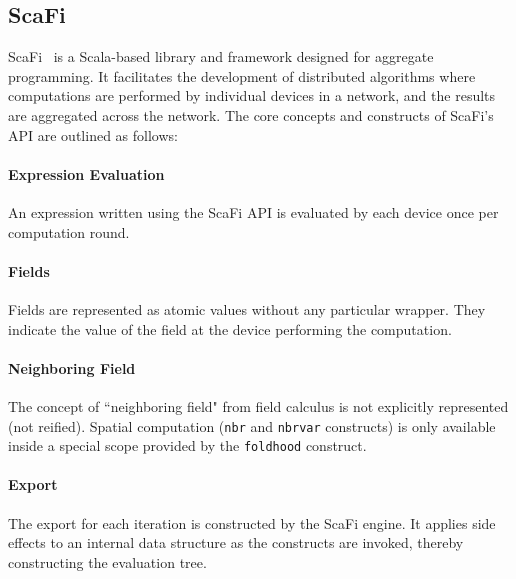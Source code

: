 \subsection{ScaFi}

ScaFi~\cite{Casadei2022} is a Scala-based library and framework designed for aggregate programming. It facilitates the development of distributed algorithms where computations are performed by individual devices in a network, and the results are aggregated across the network. The core concepts and constructs of ScaFi's API are outlined as follows:

\paragraph{Expression Evaluation}
An expression written using the ScaFi API is evaluated by each device once per computation round.

\paragraph{Fields}
Fields are represented as atomic values without any particular wrapper. They indicate the value of the field at the device performing the computation.

\paragraph{Neighboring Field}
The concept of ``neighboring field" from field calculus is not explicitly represented (not reified). Spatial computation (\texttt{nbr} and \texttt{nbrvar} constructs) is only available inside a special scope provided by the \texttt{foldhood} construct.

\paragraph{Export}
The export for each iteration is constructed by the ScaFi engine. It applies side effects to an internal data structure as the constructs are invoked, thereby constructing the evaluation tree.

